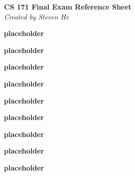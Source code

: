 \documentclass[a4paper,10pt]{article}
\begin{document}
\vspace{-1em}
\begin{center}
    \textbf{\footnotesize CS 171 Final Exam Reference Sheet} \\[-0.5em]
    \textit{\scriptsize Created by Steven He}
\end{center}

\vspace{-1em}

\begin{multicols*}{2}

\begin{tcolorbox}[title=Uninformed Search, module]
    \textbf{placeholder}
\end{tcolorbox}

\begin{tcolorbox}[title=Heuristic Search, module]
    \textbf{placeholder}
\end{tcolorbox}

\begin{tcolorbox}[title=Game Search, module]
    \textbf{placeholder}
\end{tcolorbox}

\begin{tcolorbox}[title=Constraint Satisfaction, module]
    \textbf{placeholder}
\end{tcolorbox}

\begin{tcolorbox}[title=Logic, module]
    \textbf{placeholder}
\end{tcolorbox}

\begin{tcolorbox}[title={Probability \& Uncertainty, Bayesian Networks}, module]
    \textbf{placeholder}
\end{tcolorbox}

\begin{tcolorbox}[title={Intro to ML, Linear Regression, kNN}, module]
    \textbf{placeholder}
\end{tcolorbox}

\begin{tcolorbox}[title={Decision Trees and Neural Networks}, module]
    \textbf{placeholder}
\end{tcolorbox}

\begin{tcolorbox}[title={Reinforcement Learning}, module]
    \textbf{placeholder}
\end{tcolorbox}

\end{multicols*}
\end{document}
